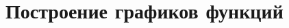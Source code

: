 \documentclass[14pt, oneside]{extbook}
\begin{document}
\section{Построение графиков функций}

\end{document}
